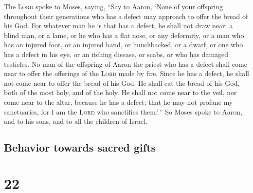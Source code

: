  The \textsc{Lord} spoke to Moses, saying,
 ``Say to Aaron, `None of your offspring throughout their
generations who has a defect may approach to offer the bread of his God.
 For whatever man he is that has a defect, he shall not
draw near: a blind man, or a lame, or he who has a flat nose, or any
deformity,  or a man who has an injured foot, or an
injured hand,  or hunchbacked, or a dwarf, or one who has
a defect in his eye, or an itching disease, or scabs, or who has damaged
testicles.  No man of the offspring of Aaron the priest
who has a defect shall come near to offer the offerings of the
\textsc{Lord} made by fire. Since he has a defect, he shall not come
near to offer the bread of his God.  He shall eat the
bread of his God, both of the most holy, and of the holy.
 He shall not come near to the veil, nor come near to the
altar, because he has a defect; that he may not profane my sanctuaries,
for I am the \textsc{Lord} who sanctifies them.'\,''  So
Moses spoke to Aaron, and to his sons, and to all the children of
Israel.

\hypertarget{behavior-towards-sacred-gifts}{%
\subsection{Behavior towards sacred
gifts}\label{behavior-towards-sacred-gifts}}

\hypertarget{section-21}{%
\section{22}\label{section-21}}

